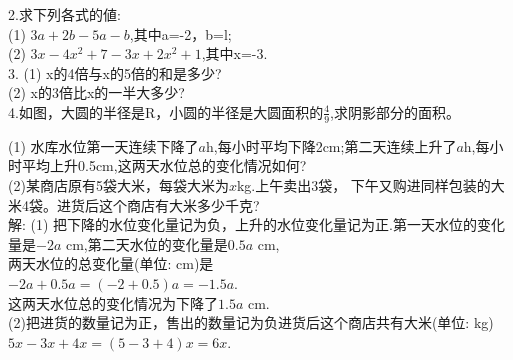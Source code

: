 \documentclass[UTF8]{report}
\theoremstyle{definition}
\theoremstyle{remark}
\begin{document}
\begin{Exercise}2.求下列各式的値:
\\(1) $3a+2b-5a-b$,其中a=-2，b=l;\\(2) $3x-4x^{2}+7-3x+2x^{2}+1$,其中x=-3.
\\3. (1) x的4倍与x的5倍的和是多少?
\\(2) x的3倍比x的一半大多少?
\\4.如图，大圆的半径是R，小圆的半径是大圆面积的$\frac{4}{9}$,求阴影部分的面积。
\end{Exercise}

\begin{Exercise}
(1) 水库水位第一天连续下降了$a$h,每小时平均下降2cm;第二天连续上升了$a$h,每小时平均上升0.5cm,这两天水位总的变化情况如何?
\\(2)某商店原有5袋大米，每袋大米为$x$kg.上午卖出3袋， 下午又购进同样包装的大米4袋。进货后这个商店有大米多少千克?
\\ 解: (1) 把下降的水位变化量记为负，上升的水位变化量记为正.第一天水位的变化量是$-2a$ cm,第二天水位的变化量是$0.5a$ cm,
\\ 两天水位的总变化量(单位: cm)是
\\  $-2a+0.5a=(-2+0.5)a= -1.5a$.
\\ 这两天水位总的变化情况为下降了$1.5a$ cm.
\\ (2)把进货的数量记为正，售出的数量记为负进货后这个商店共有大米(单位: kg)
\\  $5x-3x+4x=(5-3+4)x=6x$.
\end{Exercise}
\end{document}
